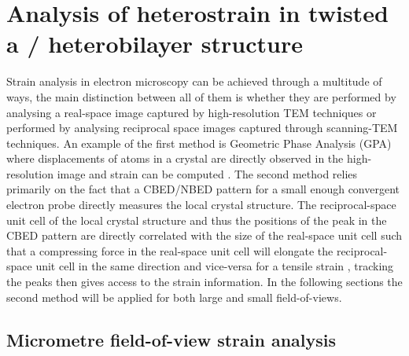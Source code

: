 \chapter{Analysis of heterostrain in twisted a /\- heterobilayer structure}
\label{sec:heterostrain}
%
Strain analysis in electron microscopy can be achieved through a multitude of ways, the main distinction between all of them is whether they are performed by analysing a real-space image captured by high-resolution TEM techniques or performed by analysing reciprocal space images captured through scanning-TEM techniques. 
%
An example of the first method is Geometric Phase Analysis (GPA) where displacements of atoms in a crystal are directly observed in the high-resolution image and strain can be computed \cite{HYTCH1998131, hytchGEOMETRICPHASEANALYSIS1997, nguyenAtomicDefectsDoping2017}. 
%
The second method relies primarily on the fact that a CBED/NBED pattern for a small enough convergent electron probe directly measures the local crystal structure. 
%
The reciprocal-space unit cell of the local crystal structure and thus the positions of the peak in the CBED pattern are directly correlated with the size of the real-space unit cell such that a compressing force in the real-space unit cell will elongate the reciprocal-space unit cell in the same direction and vice-versa for a tensile strain \cite{ophusFourDimensionalScanningTransmission2019, vanwinkleRotationalDilationalReconstruction2023, kazmierczakStrainFieldsTwisted2021, hanStrainMappingTwoDimensional2018}, tracking the peaks then gives access to the strain information.  In the following sections the second method will be applied for both large and small field-of-views.


\section{Micrometre field-of-view strain analysis}
%

